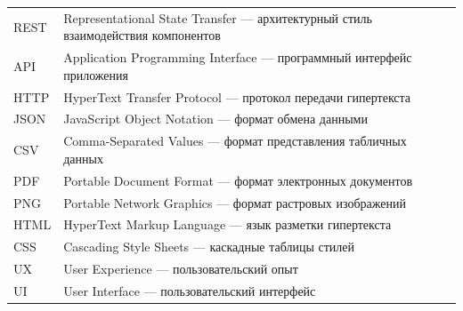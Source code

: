 {\newpage

\begin{tabular}{@{}lp{10cm}@{}}
REST & Representational State Transfer --- архитектурный стиль взаимодействия компонентов \\[4pt]
API & Application Programming Interface --- программный интерфейс приложения \\[4pt]
HTTP & HyperText Transfer Protocol --- протокол передачи гипертекста \\[4pt]
JSON & JavaScript Object Notation --- формат обмена данными \\[4pt]
CSV & Comma-Separated Values --- формат представления табличных данных \\[4pt]
PDF & Portable Document Format --- формат электронных документов \\[4pt]
PNG & Portable Network Graphics --- формат растровых изображений \\[4pt]
HTML & HyperText Markup Language --- язык разметки гипертекста \\[4pt]
CSS & Cascading Style Sheets --- каскадные таблицы стилей \\[4pt]
UX & User Experience --- пользовательский опыт \\[4pt]
UI & User Interface --- пользовательский интерфейс \\[4pt]
\end{tabular}
}